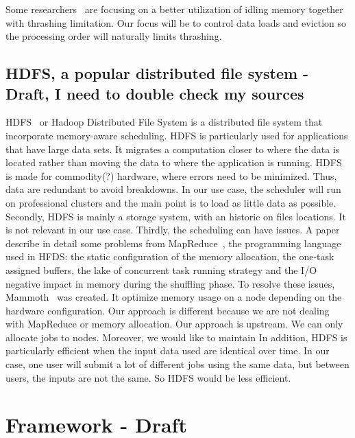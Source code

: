 \documentclass[conference,10pt]{IEEEtran}
\begin{document}
Some researchers~\cite{Nikolopoulos2003AdaptiveSU}
are focusing on a better utilization of idling memory together with 
thrashing limitation. Our focus will be to control data loads and eviction so the
processing order will naturally limits thrashing.

\subsection{HDFS, a popular distributed file system - Draft, I need to double check my sources}
HDFS~\cite{hdfs} or Hadoop Distributed File System is a distributed file system that
incorporate memory-aware scheduling. HDFS is particularly used for applications that have large data sets. 
It migrates a computation closer to where the data is located rather than moving the data to where
the application is running.
HDFS is made for commodity(?) hardware, where errors need to be minimized. Thus, data are redundant
to avoid breakdowns.
In our use case, the scheduler will run on professional clusters and the main point is to load as 
little data as possible. 
Secondly, HDFS is mainly a storage system, with an historic on files locations.
It is not relevant in our use case. 
Thirdly, the scheduling can have issues. A paper describe in detail some problems from MapReduce~\cite{issue_with_hdfs}, the
programming language used in HFDS: the static configuration of the memory allocation, the one-task assigned buffers, the
lake of concurrent task running strategy and the I/O negative impact in memory during the shuffling phase.
To resolve these issues, Mammoth~\cite{Mammoth} was created. It optimize memory usage on a node depending on the hardware configuration.
Our approach is different because we are not dealing with MapReduce or memory allocation.
Our approach is upstream. We can only allocate jobs to nodes. Moreover, we would like to maintain
In addition, HDFS is particularly efficient when the input data used are identical over time.
In our case, one user will submit a lot of different jobs using the same data, but between users,
the inputs are not the same. So HDFS would be less efficient.

\section{Framework - Draft}\label{sec.framework}
\end{document}
